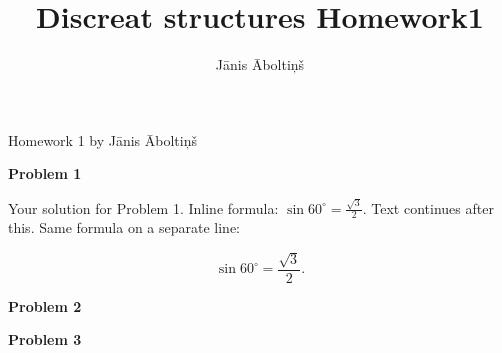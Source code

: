 \documentclass[man]{apa6}
\title{Discreat structures Homework1}
\author{J\={a}nis \=Abolti\c{n}\v{s}}
\affiliation{Riga Business School}
\begin{document}
\thispagestyle{empty}



\vspace*{72pt}
{\LARGE Homework 1 by J\={a}nis \=Abolti\c{n}\v{s}}

{\Large \bf Problem 1}



Your solution for Problem 1.
Inline formula: $\sin 60^{\circ} = \frac{\sqrt{3}}{2}$. 
Text continues after this. Same formula on a separate line:

\[ \sin 60^{\circ} = \frac{\sqrt{3}}{2}. \]



\vspace{24pt}
{\Large \bf Problem 2}




\vspace{24pt}
{\Large \bf Problem 3}

\end{document}
